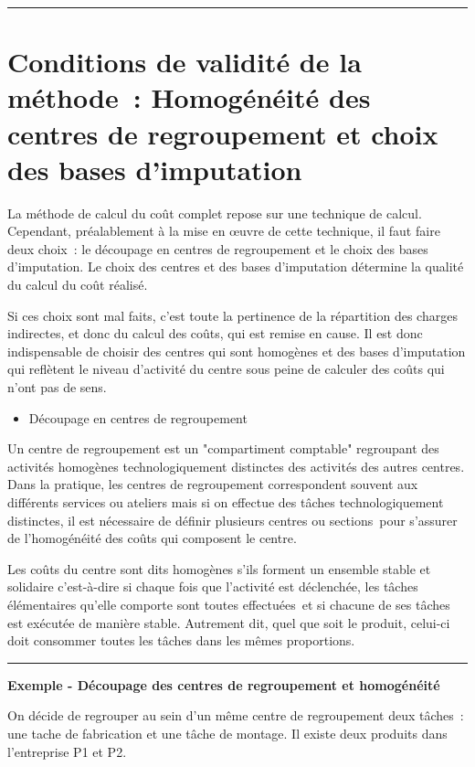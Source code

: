\documentclass[oneside]{kaobook}
\begin{document}
\noindent\rule{\textwidth}{0.5pt}

\section{Conditions de validité de la méthode : Homogénéité des centres de regroupement et choix des bases d'imputation}
\label{sec:org486d3bf}
La méthode de calcul du coût complet repose sur une technique de calcul. Cependant, préalablement à la mise en œuvre de cette technique, il faut faire deux choix : le découpage en centres de regroupement et le choix des bases d'imputation. Le choix des centres et des bases d'imputation détermine la qualité du calcul du coût réalisé.

Si ces choix sont mal faits, c'est toute la pertinence de la répartition des charges indirectes, et donc du calcul des coûts, qui est remise en cause. Il est donc indispensable de choisir des centres qui sont homogènes et des bases d'imputation qui reflètent le niveau d'activité du centre sous peine de calculer des coûts qui n'ont pas de sens.

\begin{itemize}
\item Découpage en centres de regroupement
\end{itemize}

Un centre de regroupement est un "compartiment comptable" regroupant des activités homogènes technologiquement distinctes des activités des autres centres. Dans la pratique, les centres de regroupement correspondent souvent aux différents services ou ateliers mais si on effectue des tâches technologiquement distinctes, il est nécessaire de définir plusieurs centres ou sections pour s'assurer de l'homogénéité des coûts qui composent le centre.

Les coûts du centre sont dits homogènes s'ils forment un ensemble stable et solidaire c'est-à-dire si chaque fois que l'activité est déclenchée, les tâches élémentaires qu'elle comporte sont toutes effectuées et si chacune de ses tâches est exécutée de manière stable. Autrement dit, quel que soit le produit, celui-ci doit consommer toutes les tâches dans les mêmes proportions.

\noindent\rule{\textwidth}{0.5pt}
\textbf{Exemple - Découpage des centres de regroupement et homogénéité}

On décide de regrouper au sein d'un même centre de regroupement deux tâches : une tache de fabrication et une tâche de montage. Il existe deux produits dans l'entreprise P1 et P2.
\end{document}
